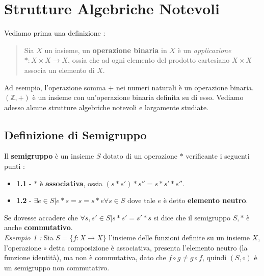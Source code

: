 \documentclass[12pt, letterpaper]{article}
\begin{document}
\section{Strutture Algebriche Notevoli}
Vediamo prima una definizione :
\begin{quote}
    Sia \(X\) un insieme, un \textbf{operazione binaria} in \(X\) è un \textit{applicazione} 
    \(* : X\times X \rightarrow X\), ossia che ad ogni elemento del prodotto cartesiano \(X\times X\) associa
    un elemento di \(X\).
\end{quote}
Ad esempio, l'operazione somma \(+\) nei numeri naturali è un operazione binaria. \((\mathbb{Z},+)\) è un insieme con 
un'operazione binaria definita su di esso. Vediamo adesso alcune strutture algebriche notevoli e largamente studiate.
\subsection{Definizione di Semigruppo}
Il \textbf{semigruppo} è un insieme \(S\) dotato di un operazione \(*\) verificante i seguenti punti :
\begin{itemize}
    \item \textbf{1.1} - \(*\) è \textbf{associativa}, ossia \((s*s')*s''=s*s'*s''\).
    \item \textbf{1.2} - \(\exists e \in S | e*s=s=s*e \forall s\in S\) dove tale \(e\) è detto \textbf{elemento neutro}.
\end{itemize}
Se dovesse accadere che \(\forall s,s' \in S | s*s'=s'*s\) si dice che il semigruppo \(S,*\) è anche \textbf{commutativo}.
\\\textit{Esempio 1 : } Sia \(S=\{f:X\rightarrow X\}\) l'insieme delle funzioni definite su un insieme \(X\), l'operazione
\(\circ \) detta composizione è associativa, presenta l'elemento neutro (la funzione identità), ma non è commutativa, 
dato che \(f \circ g\ne g \circ f\), quindi \((S,\circ)\) è un semigruppo non commutativo.
\end{document}

